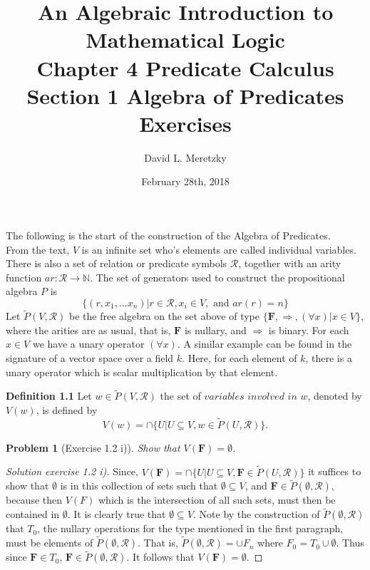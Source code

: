 \documentclass{article}
\title{ \vspace{-10ex} %
An Algebraic Introduction to Mathematical Logic\\
Chapter 4 Predicate Calculus \\
Section 1 Algebra of Predicates \\
Exercises 
}
\author{David L. Meretzky
}
\date{%
February 28th, 2018
}
\theoremstyle{problemstyle}
\newtheorem{problem}{Problem}
\begin{document}
\maketitle




The following is the start of the construction of the Algebra of Predicates.\\

From the text, $V$ is an infinite set who's elements are called individual variables. There is also a set of relation or predicate symbols $\mathscr{R}$, together with an arity function $ar:\mathscr{R}\rightarrow \mathbb{N}$.  The set of generators used to construct the propositional algebra $P$ is $$\{(r,x_1,...x_n)|r \in \mathscr{R}, x_i \in V, \text{ and }ar(r) = n\}$$ Let $\widetilde{P}(V,\mathscr{R})$ be the free algebra on the set above of type $\{\textbf{F}, \Rightarrow,(\forall x)|x \in V\}$, where the arities are as usual, that is, $\textbf{F}$ is nullary, and $\Rightarrow$ is binary.  For each $x \in V$ we have a unary operator $(\forall x)$. A similar example can be found in the signature of a vector space over a field $k$. Here, for each element of $k$, there is a unary operator which is scalar multiplication by that element. 

\begin{flushleft}
\textbf{Definition 1.1} Let $w \in \widetilde{P}(V,\mathscr{R})$ the set of $variables$ $involved$ $in$ $w$, denoted by $V(w)$, is defined by $$V(w) = \cap\{U|U \subseteq V, w\in \widetilde{P}(U,\mathscr{R})\}.$$
\end{flushleft}

\begin{problem}[Exercise 1.2 i)] 
Show that $V(\textbf{F}) = \emptyset$.
\end{problem}

\begin{proof}[Solution exercise 1.2 i)]
Since, $V(\textbf{F}) = \cap\{U|U \subseteq V, \textbf{F} \in \widetilde{P}(U,\mathscr{R})\}$ it suffices to show that $\emptyset$ is in this collection of sets such that $\emptyset \subseteq V$, and $\textbf{F} \in \widetilde{P}(\emptyset,\mathscr{R})$, because then $V(F)$ which is the intersection of all such sets, must then be contained in $\emptyset$. It is clearly true that $\emptyset \subseteq V$. Note by the construction of $\widetilde{P}(\emptyset,\mathscr{R})$ that $T_0$, the nullary operations for the type mentioned in the first paragraph, must be elements of $\widetilde{P}(\emptyset,\mathscr{R})$. That is, $\widetilde{P}(\emptyset,\mathscr{R}) = \cup F_n$ where $F_0 = T_0 \cup \emptyset$. Thus since $\textbf{F} \in T_0$, $\textbf{F} \in \widetilde{P}(\emptyset,\mathscr{R})$. It follows that $V(\textbf{F}) = \emptyset$.
\end{proof}
\end{document}
